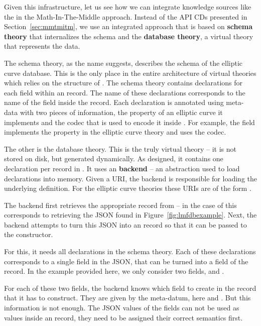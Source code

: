 Given this infrastructure, let us see how we can integrate knowledge sources like the
\lmfdb in the Math-In-The-Middle approach. Instead of the API CDs presented in
Section~\ref{sec:mmtmitm}, we use an integrated approach that is based on \textbf{schema
  theory} that internalizes the \lmfdb schema and the \textbf{database theory}, a virtual
theory that represents the \lmfdb data.

The schema theory, as the name suggests, describes the schema of the \lmfdb elliptic curve
database.  This is the only place in the entire architecture of virtual theories which
relies on the structure of \lmfdb.  The schema theory contains declarations for each field
within an \lmfdb record.  The name of these declarations corresponds to the name of the
field inside the record.  Each declaration is annotated using \mmt meta-data with two
pieces of information, the property of an elliptic curve it implements and the codec that
is used to encode it inside \lmfdb.  For example, the  field implements
the  property in the elliptic curve theory and uses the
 codec.

The other is the database theory. This is the truly virtual theory -- it is not stored on
disk, but generated dynamically.  As designed, it contains one declaration per record in
\lmfdb. It uses an \mmt \textbf{backend} -- an \mmt abstraction used to load declarations
into memory.  Given a URI, the backend is responsible for loading the underlying
definition.  For the elliptic curve theories these URIs are of the form
. 

The backend first retrieves the appropriate record from {\lmfdb} -- in the case of
 this corresponds to retrieving the JSON found in
Figure~\ref{fig:lmfdbexample}.  Next, the backend attempts to turn this JSON into an \mmt
record so that it can be passed to the  constructor.

For this, it needs all declarations in the schema theory.  Each of these declarations
corresponds to a single field in the JSON, that can be turned into a field of the \mmt
record.  In the example provided here, we only consider two fields, 
and .

For each of these two fields, the backend knows which field to create in the \mmt record
that it has to construct.  They are given by the  meta-datum, here
 and .  But this information is not
enough.  The JSON values of the fields can not be used as values inside an \mmt record,
they need to be assigned their correct semantics first.

